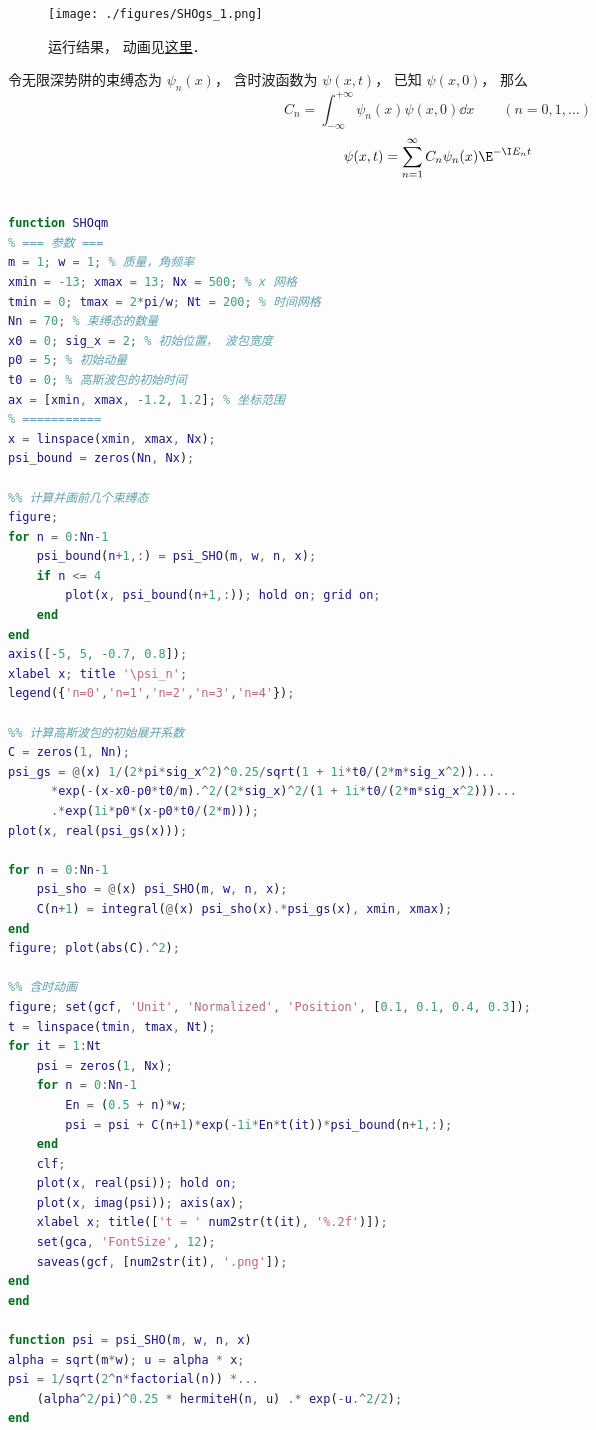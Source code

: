 

\begin{figure}[ht]
\centering
\texttt{[image: ./figures/SHOgs\_1.png]}
\caption{运行结果， 动画见\href{https://wuli.wiki/apps/SHOgs.html}{这里}．} \label{SHOgs_fig1}
\end{figure}


令无限深势阱的束缚态为 $\psi_n(x)$， 含时波函数为 $\psi(x, t)$， 已知 $\psi(x, 0)$， 那么
\begin{equation}
C_n = \int_{-\infty}^{+\infty} \psi_n(x)\psi(x, 0) \dd{x} \qquad (n=0,1,\dots)
\end{equation}
\begin{equation}
\psi(x, t) = \sum_{n=1}^\infty C_n\psi_n(x)\E^{-\I E_n t}
\end{equation}


\begin{lstlisting}[language=matlab]
% 高斯波包在简谐振子势阱中运动

function SHOqm
% === 参数 ===
m = 1; w = 1; % 质量，角频率
xmin = -13; xmax = 13; Nx = 500; % x 网格
tmin = 0; tmax = 2*pi/w; Nt = 200; % 时间网格
Nn = 70; % 束缚态的数量
x0 = 0; sig_x = 2; % 初始位置， 波包宽度
p0 = 5; % 初始动量
t0 = 0; % 高斯波包的初始时间
ax = [xmin, xmax, -1.2, 1.2]; % 坐标范围
% ===========
x = linspace(xmin, xmax, Nx);
psi_bound = zeros(Nn, Nx);

%% 计算并画前几个束缚态
figure;
for n = 0:Nn-1
    psi_bound(n+1,:) = psi_SHO(m, w, n, x);
    if n <= 4
        plot(x, psi_bound(n+1,:)); hold on; grid on;
    end
end
axis([-5, 5, -0.7, 0.8]);
xlabel x; title '\psi_n';
legend({'n=0','n=1','n=2','n=3','n=4'});

%% 计算高斯波包的初始展开系数
C = zeros(1, Nn);
psi_gs = @(x) 1/(2*pi*sig_x^2)^0.25/sqrt(1 + 1i*t0/(2*m*sig_x^2))...
      *exp(-(x-x0-p0*t0/m).^2/(2*sig_x)^2/(1 + 1i*t0/(2*m*sig_x^2)))...
      .*exp(1i*p0*(x-p0*t0/(2*m)));
plot(x, real(psi_gs(x)));

for n = 0:Nn-1
    psi_sho = @(x) psi_SHO(m, w, n, x);
    C(n+1) = integral(@(x) psi_sho(x).*psi_gs(x), xmin, xmax);
end
figure; plot(abs(C).^2);

%% 含时动画
figure; set(gcf, 'Unit', 'Normalized', 'Position', [0.1, 0.1, 0.4, 0.3]);
t = linspace(tmin, tmax, Nt);
for it = 1:Nt
    psi = zeros(1, Nx);
    for n = 0:Nn-1
        En = (0.5 + n)*w;
        psi = psi + C(n+1)*exp(-1i*En*t(it))*psi_bound(n+1,:);
    end
    clf;
    plot(x, real(psi)); hold on;
    plot(x, imag(psi)); axis(ax);
    xlabel x; title(['t = ' num2str(t(it), '%.2f')]);
    set(gca, 'FontSize', 12);
    saveas(gcf, [num2str(it), '.png']);
end
end

function psi = psi_SHO(m, w, n, x)
alpha = sqrt(m*w); u = alpha * x;
psi = 1/sqrt(2^n*factorial(n)) *...
    (alpha^2/pi)^0.25 * hermiteH(n, u) .* exp(-u.^2/2);
end
\end{lstlisting}
